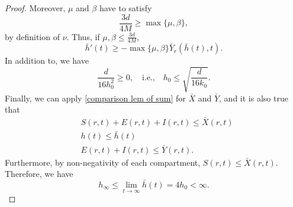 \documentclass[11pt]{amsart}
\numberwithin{equation}{section}
\theoremstyle{plain}
\theoremstyle{definition}
\begin{document}
\begin{proof}
	Moreover, $\mu$ and $\beta$ have to satisfy
	\begin{equation*}
		\frac{3d}{4M}\geq \max \{ \mu, \beta \},
	\end{equation*}
	by definition of $\nu$.
	Thus, if $\mu, \beta \leq \frac{3d}{4M}$,
	\begin{equation*}
		\bar h'(t) \geq -\max\{\mu,\beta\}\bar{Y}_r(\bar{h}(t),t).
	\end{equation*}
	In addition to, we have
	\begin{equation*}
		\frac{d}{16 h_0^2}\geq 0, \quad \text{i.e.,} \quad h_0 \leq \sqrt{\frac{d}{16 k_0}}.
	\end{equation*}
	Finally, we can apply \cref{comparison lem of sum} for $\bar X$ and $\bar Y$, and it is also true that
	\begin{equation*}
		\begin{aligned}
			&S(r,t)+E(r,t)+I(r,t) \leq \bar X (r,t)\\
			&h(t) \leq \bar h(t)\\
			&E(r,t)+I(r,t) \leq \bar Y(r,t).
		\end{aligned}
	\end{equation*}
	Furthermore, by non-negativity of each compartment, $S(r,t)\leq \bar X (r,t)$. Therefore, we have
	\begin{equation*}
		h_\infty \leq \lim_{t\to \infty}\bar h (t) =4h_0 < \infty.
	\end{equation*}
\end{proof}
\end{document}

